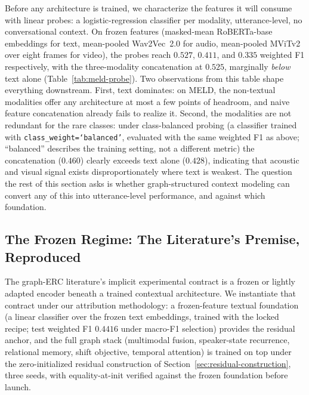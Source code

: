 Before any architecture is trained, we characterize the features it will consume with linear probes: a logistic-regression classifier per modality, utterance-level, no conversational context. On frozen features (masked-mean RoBERTa-base embeddings for text, mean-pooled Wav2Vec~2.0 for audio, mean-pooled MViTv2 over eight frames for video), the probes reach $0.527$, $0.411$, and $0.335$ weighted F1 respectively, with the three-modality concatenation at $0.525$, marginally \textit{below} text alone (Table~\ref{tab:meld-probe}). Two observations from this table shape everything downstream. First, text dominates: on MELD, the non-textual modalities offer any architecture at most a few points of headroom, and naive feature concatenation already fails to realize it. Second, the modalities are not redundant for the rare classes: under class-balanced probing (a classifier trained with \texttt{class\_weight=`balanced'}, evaluated with the same weighted F1 as above; ``balanced'' describes the training setting, not a different metric) the concatenation ($0.460$) clearly exceeds text alone ($0.428$), indicating that acoustic and visual signal exists disproportionately where text is weakest. The question the rest of this section asks is whether graph-structured context modeling can convert any of this into utterance-level performance, and against which foundation.



\subsection{The Frozen Regime: The Literature's Premise, Reproduced}
\label{sec:meld-frozen}

The graph-ERC literature's implicit experimental contract is a frozen or lightly adapted encoder beneath a trained contextual architecture. We instantiate that contract under our attribution methodology: a frozen-feature textual foundation (a linear classifier over the frozen text embeddings, trained with the locked recipe; test weighted F1 $0.4416$ under macro-F1 selection) provides the residual anchor, and the full graph stack (multimodal fusion, speaker-state recurrence, relational memory, shift objective, temporal attention) is trained on top under the zero-initialized residual construction of Section~\ref{sec:residual-construction}, three seeds, with equality-at-init verified against the frozen foundation before launch.

